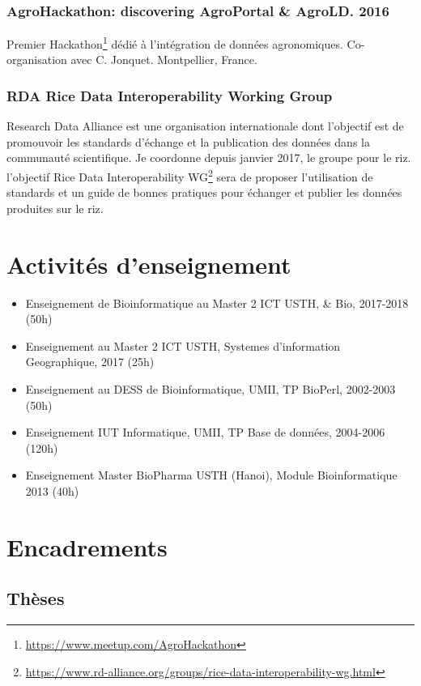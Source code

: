 \subsubsection*{AgroHackathon: discovering AgroPortal \& AgroLD. 2016 } Premier Hackathon\footnote{\url{https://www.meetup.com/AgroHackathon}} dédié à l’intégration de données agronomiques. Co-organisation avec C. Jonquet. Montpellier, France.


\subsubsection*{RDA Rice Data Interoperability Working Group} Research Data Alliance est une organisation internationale dont l'objectif est de promouvoir les standards d’échange et la publication des données dans la communauté scientifique. Je coordonne depuis janvier 2017, le groupe pour le riz. l'objectif Rice Data Interoperability WG\footnote{\url{https://www.rd-alliance.org/groups/rice-data-interoperability-wg.html}} sera de proposer l’utilisation de standards et un guide de bonnes pratiques pour échanger et publier les données produites sur le riz. 


\section{Activités d’enseignement}
\begin{itemize}
\item Enseignement de Bioinformatique au Master 2 ICT USTH, \& Bio, 2017-2018 (50h)
\item Enseignement au Master 2 ICT USTH, Systemes d’information Geographique, 2017 (25h)
\item Enseignement au DESS de Bioinformatique, UMII, TP BioPerl, 2002-2003 (50h)
\item Enseignement IUT Informatique, UMII, TP Base de données, 2004-2006 (120h)
\item Enseignement Master BioPharma USTH (Hanoi), Module Bioinformatique 2013 (40h)
\end{itemize}


\section{Encadrements}

\subsection*{Thèses}

